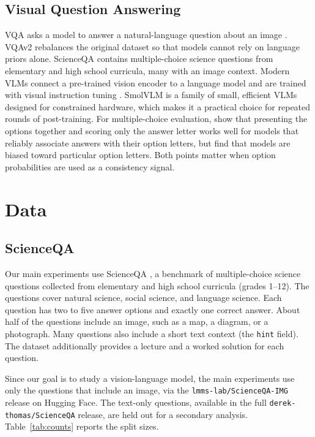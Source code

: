 \documentclass{article}
\begin{document}
\subsection{Visual Question Answering}
VQA asks a model to answer a natural-language question about an image \citep{antol2015vqa}. VQAv2 \citep{goyal2017vqav2} rebalances the original dataset so that models cannot rely on language priors alone. ScienceQA \citep{lu2022scienceqa} contains multiple-choice science questions from elementary and high school curricula, many with an image context. Modern VLMs connect a pre-trained vision encoder to a language model and are trained with visual instruction tuning \citep{liu2023llava, liu2024llava15}. SmolVLM \citep{marafioti2025smolvlm} is a family of small, efficient VLMs designed for constrained hardware, which makes it a practical choice for repeated rounds of post-training. For multiple-choice evaluation, \citet{robinson2023mcqa} show that presenting the options together and scoring only the answer letter works well for models that reliably associate answers with their option letters, but \citet{zheng2024selectionbias} find that models are biased toward particular option letters. Both points matter when option probabilities are used as a consistency signal.

\section{Data}

\subsection{ScienceQA}
Our main experiments use ScienceQA \citep{lu2022scienceqa}, a benchmark of multiple-choice science questions collected from elementary and high school curricula (grades 1--12). The questions cover natural science, social science, and language science. Each question has two to five answer options and exactly one correct answer. About half of the questions include an image, such as a map, a diagram, or a photograph. Many questions also include a short text context (the \texttt{hint} field). The dataset additionally provides a lecture and a worked solution for each question.

Since our goal is to study a vision-language model, the main experiments use only the questions that include an image, via the \texttt{lmms-lab/ScienceQA-IMG} release on Hugging Face. The text-only questions, available in the full \texttt{derek-thomas/ScienceQA} release, are held out for a secondary analysis. Table~\ref{tab:counts} reports the split sizes.
\end{document}
